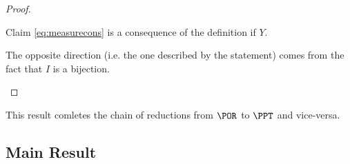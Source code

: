 \begin{proof}
\begin{itemize}
Claim \eqref{eq:measurecons} is a consequence of the definition if $Y$.

The opposite direction (i.e. the one described by the statement) comes from the fact that $I$ is a bijection.
\begin{comment}, so that we can say that $\forall N \in SM\exists M' \in PTM. I^{-1}(M') = N$, so:

\[
\{\omega \in \Os| I^{-1}(M')(\sigma, \omega)= \tau\} = \{\omega \in \Os| Y_{I(I^{-1}(M')),\sigma} (\omega) = \tau\}= \{\omega \in \Os| Y_{M',\sigma} (\omega) = \tau\}
\]
\end{comment}
\begin{comment}
\item[0] In this case the $\TT$ function doesn't contain any matching transition for the initial configuration for neither of the possible outputs on the oracle tape, in this case the output is $\sigma$. This means that both $\Delta_0(\TT)$ and $\Delta_1(\TT)$ are undefined for the initial configuration, so $X^{I(N)}_1$ is undefined for all $\omega \in \Os$. This means that $Y^{I(N)}_0=Y^{I(N)}_1$ and that $\forall \omega \in \Os. Y_{I(N),\sigma} (\omega) =\sigma$.
\begin{align*}
\{\omega \in \Os| N(\sigma)= \sigma\} &= \Os \\
                                          &= \Os =\{\omega \in \Os| Y_{I(N),\sigma} (\omega) =\sigma\}
\end{align*}

For each other value of $\tau$ both the sides of the equivalence \eqref{eq:measure} are $0$. Both the computations took exactly 0 steps.
\end{comment}
\end{itemize}
\end{proof}

This result comletes the chain of reductions from $\POR$ to $\PPT$ and vice-versa.





























\subsection{Main Result}
\label{sec:mainresult}

